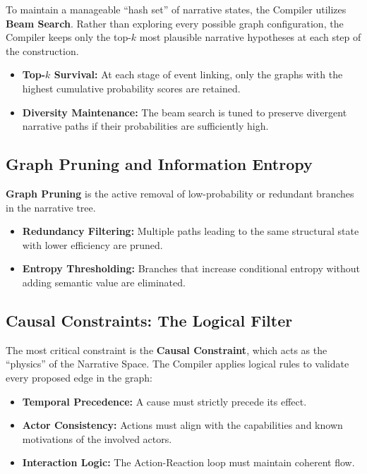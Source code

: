 \documentclass[11pt,a4paper]{article}
\begin{document}
To maintain a manageable ``hash set'' of narrative states, the Compiler
utilizes \textbf{Beam Search}. Rather than exploring every possible
graph configuration, the Compiler keeps only the top-$k$ most plausible
narrative hypotheses at each step of the construction.

\begin{itemize}[noitemsep]
  \item \textbf{Top-$k$ Survival:} At each stage of event linking, only the graphs with the highest cumulative probability scores are retained.
  \item \textbf{Diversity Maintenance:} The beam search is tuned to preserve divergent narrative paths if their probabilities are sufficiently high.
\end{itemize}

\subsection{Graph Pruning and Information Entropy}

\textbf{Graph Pruning} is the active removal of low-probability or
redundant branches in the narrative tree.

\begin{itemize}[noitemsep]
  \item \textbf{Redundancy Filtering:} Multiple paths leading to the same structural state with lower efficiency are pruned.
  \item \textbf{Entropy Thresholding:} Branches that increase conditional entropy without adding semantic value are eliminated.
\end{itemize}

\subsection{Causal Constraints: The Logical Filter}

The most critical constraint is the \textbf{Causal Constraint}, which
acts as the ``physics'' of the Narrative Space. The Compiler applies
logical rules to validate every proposed edge in the graph:

\begin{itemize}[noitemsep]
  \item \textbf{Temporal Precedence:} A cause must strictly precede its effect.
  \item \textbf{Actor Consistency:} Actions must align with the capabilities and known motivations of the involved actors.
  \item \textbf{Interaction Logic:} The Action-Reaction loop must maintain coherent flow.
\end{itemize}
\end{document}
